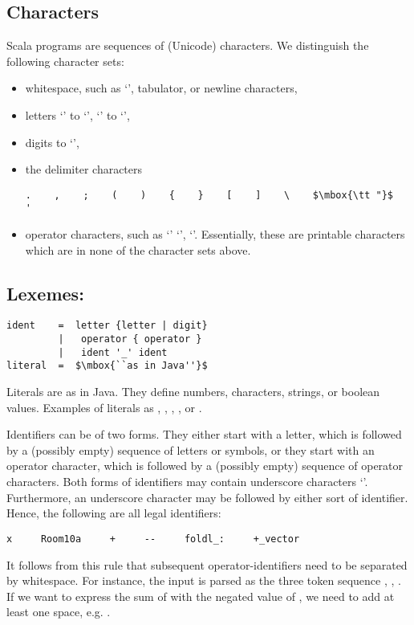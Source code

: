 \documentclass[a4paper,12pt,twoside,titlepage]{book}
\begin{document}
\subsection*{Characters}

Scala programs are sequences of (Unicode) characters. We distinguish the
following character sets:
\begin{itemize}
\item
whitespace, such as `\code{ }', tabulator, or newline characters,
\item
letters `' to `', `' to `',
\item
digits  to `',
\item
the delimiter characters

\begin{lstlisting}
.    ,    ;    (    )    {    }    [    ]    \    $\mbox{\tt "}$    '
\end{lstlisting}

\item
operator characters, such as `\code{#}' `\code{+}',
`\code{:}'. Essentially, these are printable characters which are
in none of the character sets above.
\end{itemize}

\subsection*{Lexemes:}

\begin{lstlisting}
ident    =  letter {letter | digit}
         |   operator { operator }
         |   ident '_' ident
literal  =  $\mbox{``as in Java''}$
\end{lstlisting}

Literals are as in Java. They define numbers, characters, strings, or
boolean values.  Examples of literals as , , ,
, or .

Identifiers can be of two forms. They either start with a letter,
which is followed by a (possibly empty) sequence of letters or
symbols, or they start with an operator character, which is followed
by a (possibly empty) sequence of operator characters.  Both forms of
identifiers may contain underscore characters `\code{_}'. Furthermore,
an underscore character may be followed by either sort of
identifier. Hence, the following are all legal identifiers:
\begin{lstlisting}
x     Room10a     +     --     foldl_:     +_vector
\end{lstlisting}
It follows from this rule that subsequent operator-identifiers need to
be separated by whitespace. For instance, the input
 is parsed as the three token sequence , \code{+-},
. If we want to express the sum of  with the
negated value of , we need to add at least one space,
e.g. .
\end{document}
